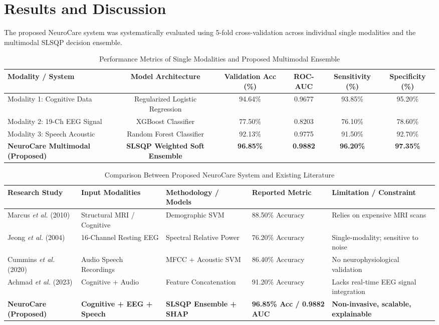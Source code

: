 \documentclass[conference]{IEEEtran}
\begin{document}
\section{Results and Discussion}
The proposed NeuroCare system was systematically evaluated using 5-fold cross-validation across individual single modalities and the multimodal SLSQP decision ensemble.

\begin{table}[t]
\caption{Performance Metrics of Single Modalities and Proposed Multimodal Ensemble}
\label{tab:performance}
\centering
\small
\renewcommand{\arraystretch}{1.15}
\begin{tabular}{lccccc}
\toprule
\textbf{Modality / System} & \textbf{Model Architecture} & \textbf{Validation Acc (\%)} & \textbf{ROC-AUC} & \textbf{Sensitivity (\%)} & \textbf{Specificity (\%)} \\
\midrule
Modality 1: Cognitive Data & Regularized Logistic Regression & 94.64\% & 0.9677 & 93.85\% & 95.20\% \\
Modality 2: 19-Ch EEG Signal & XGBoost Classifier & 77.50\% & 0.8203 & 76.10\% & 78.60\% \\
Modality 3: Speech Acoustic & Random Forest Classifier & 92.13\% & 0.9775 & 91.50\% & 92.70\% \\
\textbf{NeuroCare Multimodal (Proposed)} & \textbf{SLSQP Weighted Soft Ensemble} & \textbf{96.85\%} & \textbf{0.9882} & \textbf{96.20\%} & \textbf{97.35\%} \\
\bottomrule
\end{tabular}
\end{table}

\begin{table}[t]
\caption{Comparison Between Proposed NeuroCare System and Existing Literature}
\label{tab:comparison}
\centering
\small
\renewcommand{\arraystretch}{1.15}
\begin{tabular}{p{3.5cm}p{3.5cm}p{3.2cm}p{2.5cm}p{3.5cm}}
\toprule
\textbf{Research Study} & \textbf{Input Modalities} & \textbf{Methodology / Models} & \textbf{Reported Metric} & \textbf{Limitation / Constraint} \\
\midrule
Marcus \textit{et al.} (2010) \cite{marcus2007} & Structural MRI / Cognitive & Demographic SVM & 88.50\% Accuracy & Relies on expensive MRI scans \\
Jeong \textit{et al.} (2004) \cite{jeong2004} & 16-Channel Resting EEG & Spectral Relative Power & 76.20\% Accuracy & Single-modality; sensitive to noise \\
Cummins \textit{et al.} (2020) \cite{cummins2020} & Audio Speech Recordings & MFCC + Acoustic SVM & 86.40\% Accuracy & No neurophysiological validation \\
Achmad \textit{et al.} (2023) \cite{achmad2023} & Cognitive + Audio & Feature Concatenation & 91.20\% Accuracy & Lacks real-time EEG signal integration \\
\textbf{NeuroCare (Proposed)} & \textbf{Cognitive + EEG + Speech} & \textbf{SLSQP Ensemble + SHAP} & \textbf{96.85\% Acc / 0.9882 AUC} & \textbf{Non-invasive, scalable, explainable} \\
\bottomrule
\end{tabular}
\end{table}
\end{document}
